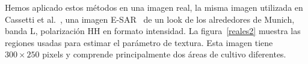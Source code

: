 %
%
%

Hemos aplicado estos métodos en una imagen real, la misma imagen utilizada en Cassetti et al.~\cite{APSAR2013ParameterEstimationStochasticDistances}, una imagen E-SAR~\cite{Horn1996} de un look de los alrededores de Munich, banda L, polarización HH en formato intensidad. La figura~\ref{reales2} muestra las regiones usadas para estimar el parámetro de textura. Esta imagen tiene $300\times250$ pixels y comprende principalmente dos áreas de cultivo diferentes.

